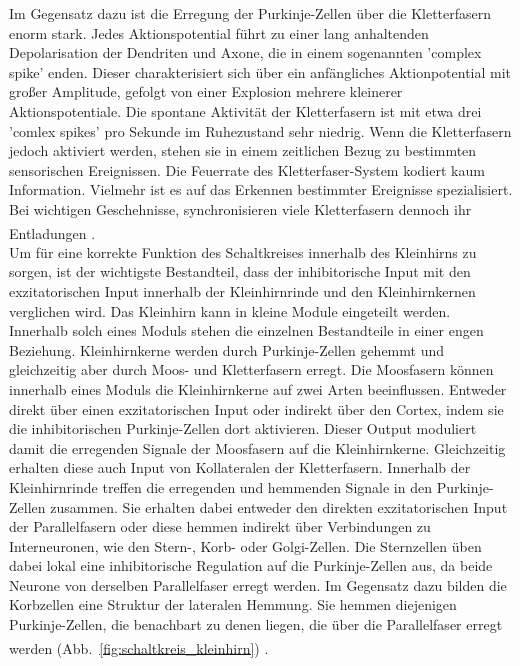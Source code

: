 \documentclass[12pt,a4paper,pdftex]{article}
\begin{document}
Im Gegensatz dazu ist die Erregung der Purkinje-Zellen über die Kletterfasern enorm stark. Jedes Aktionspotential führt zu einer lang anhaltenden Depolarisation der Dendriten und Axone, die in einem sogenannten 'complex spike' enden. Dieser charakterisiert sich über ein anfängliches Aktionpotential mit großer Amplitude, gefolgt von einer Explosion mehrere kleinerer Aktionspotentiale. Die spontane Aktivität der Kletterfasern ist mit etwa drei 'comlex spikes' pro Sekunde im Ruhezustand sehr niedrig. Wenn die Kletterfasern jedoch aktiviert werden, stehen sie in einem zeitlichen Bezug zu bestimmten sensorischen Ereignissen. Die Feuerrate des Kletterfaser-System kodiert kaum Information. Vielmehr ist es auf das Erkennen bestimmter Ereignisse spezialisiert. Bei wichtigen Geschehnisse, synchronisieren viele Kletterfasern dennoch ihr Entladungen \textsuperscript{\cite[42]{kandel2013principles}}.\\  
Um für eine korrekte Funktion des Schaltkreises innerhalb des Kleinhirns zu sorgen, ist der wichtigste Bestandteil, dass der inhibitorische Input mit den exzitatorischen Input innerhalb der Kleinhirnrinde und den Kleinhirnkernen verglichen wird. Das Kleinhirn kann in kleine Module eingeteilt werden. Innerhalb solch eines Moduls stehen die einzelnen Bestandteile in einer engen Beziehung. Kleinhirnkerne werden durch Purkinje-Zellen gehemmt und gleichzeitig aber durch Moos- und Kletterfasern erregt. Die Moosfasern können innerhalb eines Moduls die Kleinhirnkerne auf zwei Arten beeinflussen. Entweder direkt über einen exzitatorischen Input oder indirekt über den Cortex, indem sie die inhibitorischen Purkinje-Zellen dort aktivieren. Dieser Output moduliert damit die erregenden Signale der Moosfasern auf die Kleinhirnkerne. Gleichzeitig erhalten diese auch Input von Kollateralen der Kletterfasern. Innerhalb der Kleinhirnrinde treffen die erregenden und hemmenden Signale in den Purkinje-Zellen zusammen. Sie erhalten dabei entweder den direkten exzitatorischen Input der Parallelfasern oder diese hemmen indirekt über Verbindungen zu Interneuronen, wie den Stern-, Korb- oder Golgi-Zellen. Die Sternzellen üben dabei lokal eine inhibitorische Regulation auf die Purkinje-Zellen aus, da beide Neurone von derselben Parallelfaser erregt werden. Im Gegensatz dazu bilden die Korbzellen eine Struktur der lateralen Hemmung. Sie hemmen diejenigen Purkinje-Zellen, die benachbart zu denen liegen, die über die Parallelfaser erregt werden (Abb.~\ref{fig:schaltkreis_kleinhirn}) \textsuperscript{\cite[42]{kandel2013principles}}.\\   
\end{document}
